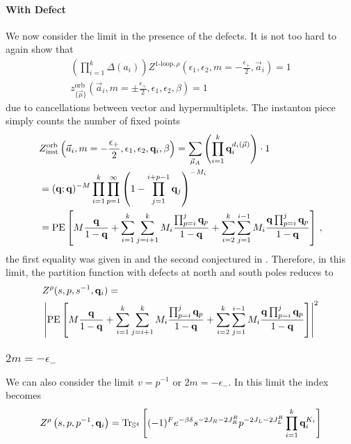 \documentclass[main.tex]{subfiles}
\begin{document}
\paragraph{With Defect}
We now consider the limit in the presence of the defects. It is not too hard to again show that
\begin{gather}
\left(\prod_{i=1}^k\Delta(a_i)\right)Z^{\text{1-loop},\rho}(\epsilon_1,\epsilon_2,m=-\frac{\epsilon_+}{2},\vec{a}_{i})=1\\
z^{\text{orb}}_{\{\vec{\mu}\}}\left(\vec{a}_i,m=\pm\frac{\epsilon_+}{2},\epsilon_1,\epsilon_2,\beta\right)=1
\end{gather}
due to cancellations between vector and hypermultiplets. 
The instanton piece simply counts the number of fixed points
\begin{equation}
\begin{aligned}
&Z_{\text{inst}}^{\text{orb}}\left(\vec{a}_i,m=-\frac{\epsilon_+}{2},\epsilon_1,\epsilon_2,\mathbf{q}_{i},\beta\right)=\sum_{\vec{\mu}_A} \left(\prod_{i=1}^k\mathbf{q}_{i}^{d_{i}(\vec{\mu})}\right)\cdot1\\
&=(\mathbf{q};\mathbf{q})^{-M}\prod_{i=1}^k\prod_{p=1}^{\infty}\left(1-\prod_{j=1}^{i+p-1}\mathbf{q}_j\right)^{-M_i}\\
&=\operatorname{\mathrm{PE}}\left[M\frac{\mathbf{q}}{1-\mathbf{q}}+\sum_{i=1}^k\sum_{j=i+1}^{k}M_i\frac{\prod_{p=i}^j\mathbf{q}_p}{1-\mathbf{q}}+\sum_{i=2}^k\sum_{j=1}^{i-1}M_i\frac{\mathbf{q}\prod_{p=i}^j\mathbf{q}_p}{1-\mathbf{q}}\right]\,,
\end{aligned}
\end{equation}
the first equality was given in \cite{Kanno:2011fw} and the second conjectured in \cite{Bullimore:2014upa}.
Therefore, in this limit, the partition function with defects at north and south poles reduces to
\begin{equation}
\begin{aligned}
&Z^{\rho}(s,p,s^{-1},\mathbf{q}_{i})=\\
&\left|\operatorname{\mathrm{PE}}\left[M\frac{\mathbf{q}}{1-\mathbf{q}}+\sum_{i=1}^k\sum_{j=i+1}^{k}M_i\frac{\prod_{p=i}^j\mathbf{q}_p}{1-\mathbf{q}}+\sum_{i=2}^k\sum_{j=1}^{i-1}M_i\frac{\mathbf{q}\prod_{p=i}^j\mathbf{q}_p}{1-\mathbf{q}}\right]\right|^2
\end{aligned}
\end{equation}
\subsubsection{\boldmath $2m=-\epsilon_-$}
We can also consider the limit $v=p^{-1}$ or $2m=-\epsilon_-$. In this limit the index becomes
\begin{equation}
Z^{\rho}\left(s,p,p^{-1},\mathbf{q}_i\right)=\operatorname{Tr}_{\mathbb{S}^4}\left[(-1)^Fe^{-\beta\delta}s^{-2J_R-2J_R^R}p^{-2J_L-2J_L^R}\prod_{i=1}^k\mathbf{q}_i^{K_i}\right]
\end{equation}
\end{document}
